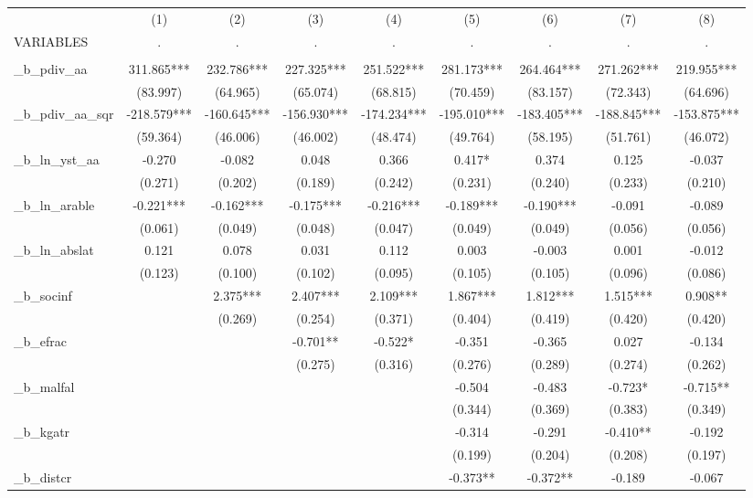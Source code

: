 \documentclass[]{article}
\begin{document}
\begin{tabular}{lcccccccc} \hline
 & (1) & (2) & (3) & (4) & (5) & (6) & (7) & (8) \\
VARIABLES & . & . & . & . & . & . & . & . \\ \hline
 &  &  &  &  &  &  &  &  \\
\_b\_pdiv\_aa & 311.865*** & 232.786*** & 227.325*** & 251.522*** & 281.173*** & 264.464*** & 271.262*** & 219.955*** \\
 & (83.997) & (64.965) & (65.074) & (68.815) & (70.459) & (83.157) & (72.343) & (64.696) \\
\_b\_pdiv\_aa\_sqr & -218.579*** & -160.645*** & -156.930*** & -174.234*** & -195.010*** & -183.405*** & -188.845*** & -153.875*** \\
 & (59.364) & (46.006) & (46.002) & (48.474) & (49.764) & (58.195) & (51.761) & (46.072) \\
\_b\_ln\_yst\_aa & -0.270 & -0.082 & 0.048 & 0.366 & 0.417* & 0.374 & 0.125 & -0.037 \\
 & (0.271) & (0.202) & (0.189) & (0.242) & (0.231) & (0.240) & (0.233) & (0.210) \\
\_b\_ln\_arable & -0.221*** & -0.162*** & -0.175*** & -0.216*** & -0.189*** & -0.190*** & -0.091 & -0.089 \\
 & (0.061) & (0.049) & (0.048) & (0.047) & (0.049) & (0.049) & (0.056) & (0.056) \\
\_b\_ln\_abslat & 0.121 & 0.078 & 0.031 & 0.112 & 0.003 & -0.003 & 0.001 & -0.012 \\
 & (0.123) & (0.100) & (0.102) & (0.095) & (0.105) & (0.105) & (0.096) & (0.086) \\
\_b\_socinf &  & 2.375*** & 2.407*** & 2.109*** & 1.867*** & 1.812*** & 1.515*** & 0.908** \\
 &  & (0.269) & (0.254) & (0.371) & (0.404) & (0.419) & (0.420) & (0.420) \\
\_b\_efrac &  &  & -0.701** & -0.522* & -0.351 & -0.365 & 0.027 & -0.134 \\
 &  &  & (0.275) & (0.316) & (0.276) & (0.289) & (0.274) & (0.262) \\
\_b\_malfal &  &  &  &  & -0.504 & -0.483 & -0.723* & -0.715** \\
 &  &  &  &  & (0.344) & (0.369) & (0.383) & (0.349) \\
\_b\_kgatr &  &  &  &  & -0.314 & -0.291 & -0.410** & -0.192 \\
 &  &  &  &  & (0.199) & (0.204) & (0.208) & (0.197) \\
\_b\_distcr &  &  &  &  & -0.373** & -0.372** & -0.189 & -0.067 \\

\end{tabular}
\end{document}
